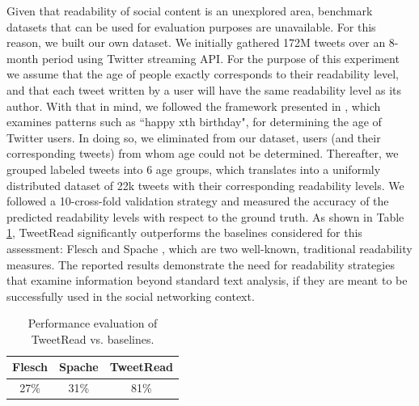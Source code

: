\documentclass{sig-alternate-05-2015}
\begin{document}
 Given that readability of social content is an unexplored area, benchmark datasets that can be used for evaluation purposes are unavailable. For this reason, we built our own dataset. We initially gathered 172M tweets over an 8-month period using Twitter streaming API. For the purpose of this experiment we assume that the age of people exactly corresponds to their readability level, and that each tweet written by a user will have the same readability level as its author. With that in mind, we followed the framework presented in \cite{age}, which examines patterns such as ``happy xth birthday", for determining the age of Twitter users. In doing so, we eliminated from our dataset, users (and their corresponding tweets) from whom age  could not be determined. Thereafter, we grouped labeled tweets into 6 age groups, which translates into a uniformly distributed dataset of 22k tweets with their corresponding readability levels. %
We followed a 10-cross-fold validation strategy and measured the accuracy of the predicted readability levels with respect to the ground truth. 
As shown in Table \ref{tab:read}, TweetRead significantly outperforms the baselines considered for this assessment: Flesch \cite{Fle48} and Spache \cite{spache1953new}, which are two well-known, traditional readability measures. The reported results demonstrate the need for readability strategies that examine information beyond standard text analysis, if they are meant to be successfully used in the social networking context.




\begin{table}[]
\centering
\begin{tabular}{|c|c|c|}
\hline
Flesch & Spache & TweetRead \\ \hline
27\% & 31\% & 81\% \\ \hline
\end{tabular}
\caption{Performance evaluation of TweetRead vs. baselines.}
\label{tab:read}
\vspace{-0.5cm}
\end{table}
\end{document}
